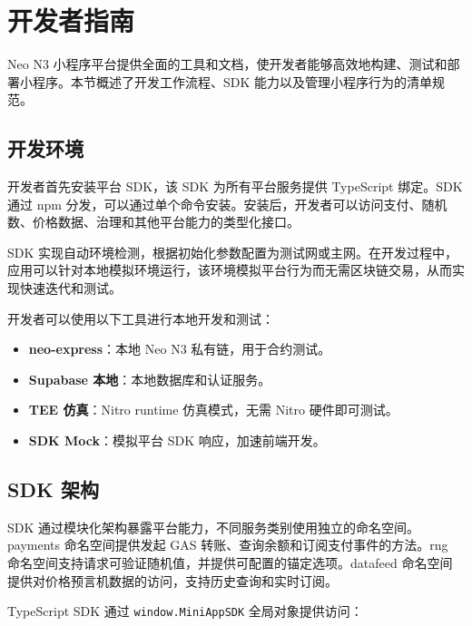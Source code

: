 \documentclass[11pt,a4paper]{article}
\begin{document}
\section{开发者指南}

Neo N3 小程序平台提供全面的工具和文档，使开发者能够高效地构建、测试和部署小程序。本节概述了开发工作流程、SDK 能力以及管理小程序行为的清单规范。

\subsection{开发环境}

开发者首先安装平台 SDK，该 SDK 为所有平台服务提供 TypeScript 绑定。SDK 通过 npm 分发，可以通过单个命令安装。安装后，开发者可以访问支付、随机数、价格数据、治理和其他平台能力的类型化接口。

SDK 实现自动环境检测，根据初始化参数配置为测试网或主网。在开发过程中，应用可以针对本地模拟环境运行，该环境模拟平台行为而无需区块链交易，从而实现快速迭代和测试。

开发者可以使用以下工具进行本地开发和测试：

\begin{itemize}
    \item \textbf{neo-express}：本地 Neo N3 私有链，用于合约测试。
    \item \textbf{Supabase 本地}：本地数据库和认证服务。
    \item \textbf{TEE 仿真}：Nitro runtime 仿真模式，无需 Nitro 硬件即可测试。
    \item \textbf{SDK Mock}：模拟平台 SDK 响应，加速前端开发。
\end{itemize}

\subsection{SDK 架构}

SDK 通过模块化架构暴露平台能力，不同服务类别使用独立的命名空间。payments 命名空间提供发起 GAS 转账、查询余额和订阅支付事件的方法。rng 命名空间支持请求可验证随机值，并提供可配置的锚定选项。datafeed 命名空间提供对价格预言机数据的访问，支持历史查询和实时订阅。

TypeScript SDK 通过 \texttt{window.MiniAppSDK} 全局对象提供访问：
\end{document}
